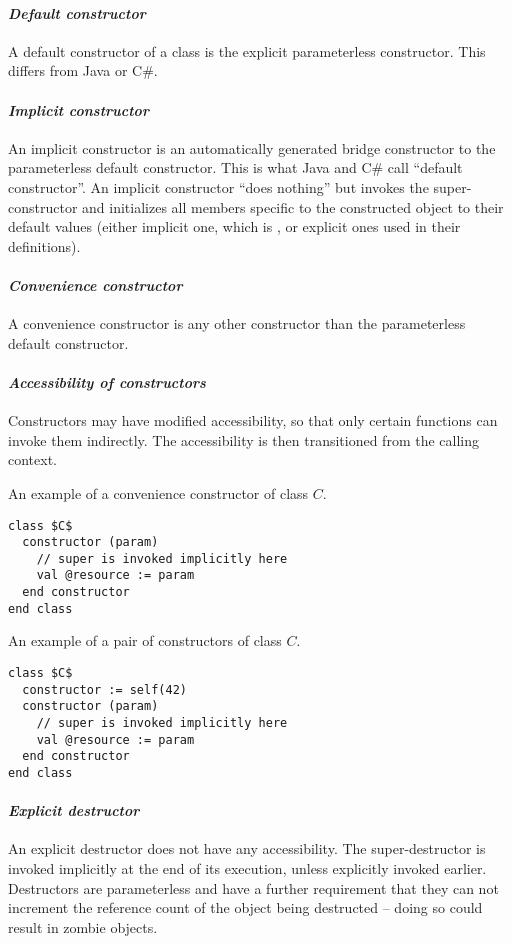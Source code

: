 \paragraph{\em Default constructor}
A default constructor of a class is the explicit parameterless constructor. This differs from Java or C\#. 

\paragraph{\em Implicit constructor}
An implicit constructor is an automatically generated bridge constructor to the parameterless default constructor. This is what Java and C\# call ``default constructor''. An implicit constructor ``does nothing'' but invokes the super-constructor and initializes all members specific to the constructed object to their default values (either implicit one, which is , or explicit ones used in their definitions). 

\paragraph{\em Convenience constructor}
A convenience constructor is any other constructor than the parameterless default constructor. 

\paragraph{\em Accessibility of constructors}
Constructors may have modified accessibility, so that only certain functions can invoke them indirectly. The accessibility is then transitioned from the calling context. 

\example An example of a convenience constructor of class $C$.
\begin{lstlisting}
class $C$
  constructor (param)
    // super is invoked implicitly here
    val @resource := param
  end constructor
end class
\end{lstlisting}

\example An example of a pair of constructors of class $C$. 
\begin{lstlisting}
class $C$
  constructor := self(42)
  constructor (param)
    // super is invoked implicitly here
    val @resource := param
  end constructor
end class
\end{lstlisting}

\paragraph{\em Explicit destructor}
An explicit destructor does not have any accessibility. The super-destructor is invoked implicitly at the end of its execution, unless explicitly invoked earlier. Destructors are parameterless and have a further requirement that they can not increment the reference count of the object being destructed -- doing so could result in zombie objects. 

